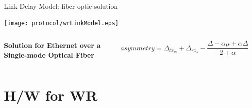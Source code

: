 \documentclass[compress,red]{beamer}
\begin{document}
\begin{frame}{Link Delay Model: fiber optic solution}

  \begin{center}
  \texttt{[image: protocol/wrLinkModel.eps]}
  \end{center}

  \begin{columns}[c]
  \column{1.5in}

    \begin{center}
      \textbf{Solution for Ethernet over a Single-mode Optical Fiber}
    \end{center}    

  \column{2.7in}

    \begin{equation}
      \nonumber asymmetry = \Delta_{tx_m} + \Delta_{rx_s} - \frac{\Delta - \alpha \mu + \alpha \Delta}{2 + \alpha}
    \end{equation}

  \end{columns}

\end{frame}
% 
% 
\section{H/W for WR}
\end{document}
